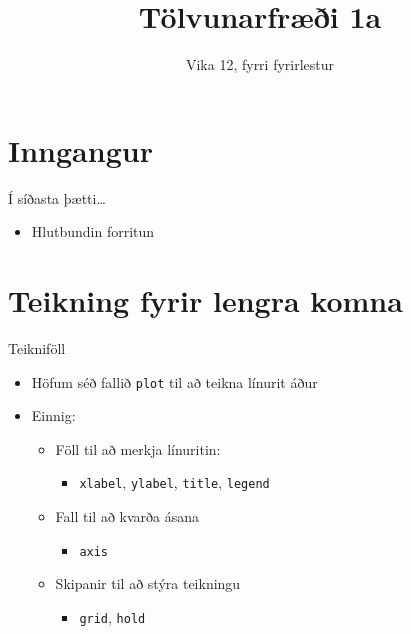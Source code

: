 \documentclass{beamer}
\title{Tölvunarfræði 1a}
\subtitle{Vika 12, fyrri fyrirlestur}
\begin{document}
\begin{frame}
\titlepage
\end{frame}

\section{Inngangur}

\begin{frame}{Í síðasta þætti\ldots}
\begin{itemize}
 \item Hlutbundin forritun
\end{itemize}
\end{frame}

\section{Teikning fyrir lengra komna}

\begin{frame}{Teikniföll}
\begin{itemize}
 \item Höfum séð fallið \texttt{plot} til að teikna línurit áður
 \item Einnig:
 \begin{itemize}
  \item Föll til að merkja línuritin:
  \begin{itemize}
   \item \texttt{xlabel}, \texttt{ylabel}, \texttt{title}, \texttt{legend}
  \end{itemize}
  \item Fall til að kvarða ásana
  \begin{itemize}
   \item \texttt{axis}
  \end{itemize}
  \item Skipanir til að stýra teikningu
  \begin{itemize}
   \item \texttt{grid}, \texttt{hold}
  \end{itemize}
 \end{itemize}
\end{itemize}
\end{frame}
\end{document}
